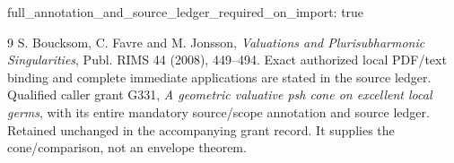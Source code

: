 \documentclass[11pt]{article}
\begin{document}
full\_annotation\_and\_source\_ledger\_required\_on\_import: true

\begin{thebibliography}{9}
S. Boucksom, C. Favre and M. Jonsson,
\emph{Valuations and Plurisubharmonic Singularities},
Publ. RIMS 44 (2008), 449--494. Exact authorized local PDF/text binding
and complete immediate applications are stated in the source ledger.
Qualified caller grant G331, \emph{A geometric valuative psh cone on
excellent local germs}, with its entire mandatory source/scope annotation
and source ledger. Retained unchanged in the accompanying grant record.
It supplies the cone/comparison, not an envelope theorem.
\end{thebibliography}
\end{document}
